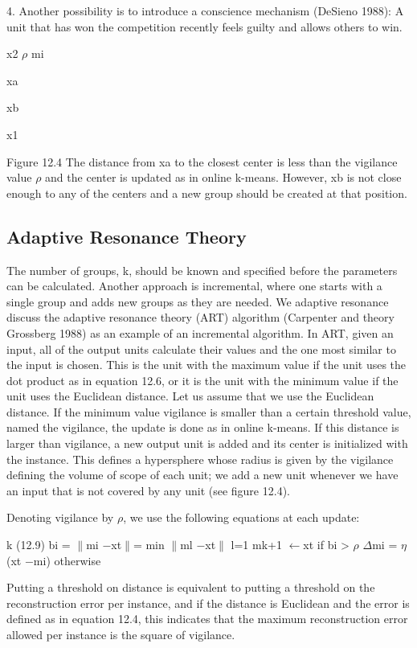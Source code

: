 4. Another possibility is to introduce a conscience mechanism (DeSieno 1988): A unit that has won the competition recently feels guilty and allows others to win.

x2 $\rho$ mi

xa

xb

x1

Figure 12.4 The distance from xa to the closest center is less than the vigilance value $\rho$ and the center is updated as in online k-means. However, xb is not close enough to any of the centers and a new group should be created at that position.

\subsection{Adaptive Resonance Theory}

The number of groups, k, should be known and specified before the parameters can be calculated. Another approach is incremental, where one starts with a single group and adds new groups as they are needed. We adaptive resonance discuss the adaptive resonance theory (ART) algorithm (Carpenter and theory Grossberg 1988) as an example of an incremental algorithm. In ART, given an input, all of the output units calculate their values and the one most similar to the input is chosen. This is the unit with the maximum value if the unit uses the dot product as in equation 12.6, or it is the unit with the minimum value if the unit uses the Euclidean distance. Let us assume that we use the Euclidean distance. If the minimum value vigilance is smaller than a certain threshold value, named the vigilance, the update is done as in online k-means. If this distance is larger than vigilance, a new output unit is added and its center is initialized with the instance. This defines a hypersphere whose radius is given by the vigilance defining the volume of scope of each unit; we add a new unit whenever we have an input that is not covered by any unit (see figure 12.4).

Denoting vigilance by $\rho$, we use the following equations at each update:

k (12.9) bi = $\parallel$mi $-$xt$\parallel$= min $\parallel$ml $-$xt$\parallel$ l=1 mk+1 $\leftarrow$xt if bi > $\rho$ $\Delta$mi = $\eta$(xt $-$mi) otherwise

Putting a threshold on distance is equivalent to putting a threshold on the reconstruction error per instance, and if the distance is Euclidean and the error is defined as in equation 12.4, this indicates that the maximum reconstruction error allowed per instance is the square of vigilance.

